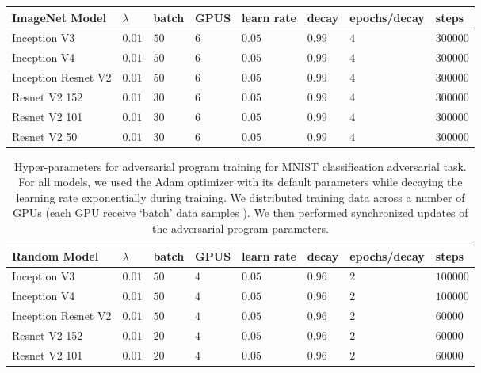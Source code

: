 \documentclass{article}
\begin{document}
\begin{table}
  \label{table: hyperparams cifar}
  \centering
  \begin{tabular}{llllllll}
    \toprule
     ImageNet Model &  $\lambda$ & batch & GPUS & learn rate & decay & epochs/decay & steps \\
     \midrule
    Inception V3                 & $0.01$ & $50$  & $6$  &  $0.05$ & $0.99$ & $4$ & $300000$  \\
    Inception V4                & $0.01$ & $50$  & $6$  &  $0.05$ & $0.99$ & $4$ & $300000$  \\
    Inception Resnet V2    & $0.01$ & $50$  & $6$  &  $0.05$ & $0.99$ & $4$ & $300000$  \\
    Resnet V2 152            & $0.01$ & $30$  & $6$  &  $0.05$ & $0.99$ & $4$ & $300000$  \\
    Resnet V2 101           & $0.01$ & $30$  & $6$  &  $0.05$ & $0.99$ & $4$ & $300000$  \\
    Resnet V2 50           & $0.01$ & $30$  & $6$  &  $0.05$ & $0.99$ & $4$ & $300000$  \\
    \bottomrule
  \end{tabular}
\end{table}\begin{table}
  \caption{Hyper-parameters for adversarial program training for MNIST classification adversarial task. For all models, we used the Adam optimizer with its default parameters while decaying the learning rate exponentially during training.  We distributed training data across a number of GPUs (each GPU receive `batch' data samples ). We then performed synchronized updates of the adversarial program parameters.}
  \label{table: hyperparams mnist random}
  \centering
  \begin{tabular}{llllllll}
    \toprule
     Random Model &  $\lambda$ & batch & GPUS & learn rate & decay & epochs/decay & steps \\
     \midrule
    Inception V3                 & $0.01$ & $50$  & $4$  &  $0.05$ & $0.96$ & $2$ & $100000$  \\
    Inception V4                & $0.01$ & $50$  & $4$  &  $0.05$ & $0.96$ & $2$ & $100000$  \\
    Inception Resnet V2    & $0.01$ & $50$  & $4$  &  $0.05$ & $0.96$ & $2$ & $60000$  \\
    Resnet V2 152            & $0.01$ & $20$  & $4$  &  $0.05$ & $0.96$ & $2$ & $60000$  \\
    Resnet V2 101           & $0.01$ & $20$  & $4$  &  $0.05$ & $0.96$ & $2$ & $60000$  \\

\end{tabular}
\end{table}
\end{document}

